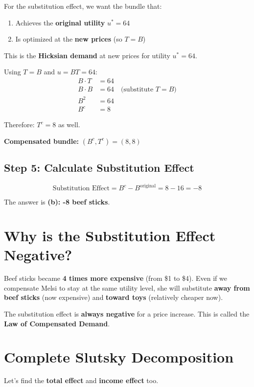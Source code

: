 \documentclass[11pt]{article}
\begin{document}
For the substitution effect, we want the bundle that:
\begin{enumerate}
    \item Achieves the \textbf{original utility} $u^* = 64$
    \item Is optimized at the \textbf{new prices} (so $T = B$)
\end{enumerate}

This is the \textbf{Hicksian demand} at new prices for utility $u^* = 64$.

Using $T = B$ and $u = BT = 64$:
\begin{align*}
B \cdot T &= 64 \\
B \cdot B &= 64 \quad \text{(substitute } T = B \text{)} \\
B^2 &= 64 \\
B^c &= 8
\end{align*}

Therefore: $T^c = 8$ as well.

\textbf{Compensated bundle:} $(B^c, T^c) = (8, 8)$

\subsection{Step 5: Calculate Substitution Effect}

$$\text{Substitution Effect} = B^c - B^{\text{original}} = 8 - 16 = \boxed{-8}$$

The answer is \textbf{(b): -8 beef sticks}.

\section{Why is the Substitution Effect Negative?}

Beef sticks became \textbf{4 times more expensive} (from \$1 to \$4). Even if we compensate Melsi to stay at the same utility level, she will substitute \textbf{away from beef sticks} (now expensive) and \textbf{toward toys} (relatively cheaper now).

The substitution effect is \textbf{always negative} for a price increase. This is called the \textbf{Law of Compensated Demand}.

\section{Complete Slutsky Decomposition}

Let's find the \textbf{total effect} and \textbf{income effect} too.
\end{document}
